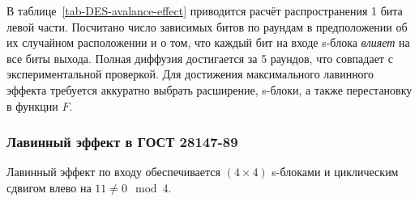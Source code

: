 В таблице~\ref{tab-DES-avalance-effect} приводится расчёт распространения 1 бита левой части. Посчитано число зависимых битов по раундам в предположении об их случайном расположении и о том, что каждый бит на входе s-блока \emph{влияет} на все биты выхода. Полная диффузия достигается за 5 раундов, что совпадает с экспериментальной проверкой. Для достижения максимального лавинного эффекта требуется аккуратно выбрать расширение, s-блоки, а также перестановку в функции $F$.


\subsubsection{Лавинный эффект в ГОСТ 28147-89}

Лавинный эффект по входу обеспечивается $(4 \times 4)$ s-блоками и циклическим сдвигом влево на $11 \neq 0 \mod 4$.

\begin{table}[!ht]
    \centering
    \caption{Распространение влияния 1 бита левой части в ГОСТ 28147-89\label{tab:GOST-avalance-effect}}
\end{table}

